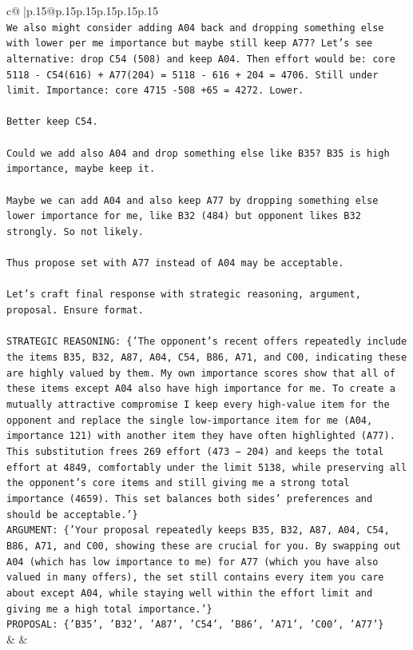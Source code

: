 \documentclass{article}
\begin{document}
{\begin{supertabular}{c@{$\;$}|p{.15\linewidth}@{}p{.15\linewidth}p{.15\linewidth}p{.15\linewidth}p{.15\linewidth}p{.15\linewidth}}
{{{\\ 
\texttt{We also might consider adding A04 back and dropping something else with lower per me importance but maybe still keep A77? Let's see alternative: drop C54 (508) and keep A04. Then effort would be: core 5118 {-} C54(616) + A77(204) = 5118 {-} 616 + 204 = 4706. Still under limit. Importance: core 4715 {-}508 +65 = 4272. Lower.} \\
\\ 
\texttt{Better keep C54.} \\
\\ 
\texttt{Could we add also A04 and drop something else like B35? B35 is high importance, maybe keep it.} \\
\\ 
\texttt{Maybe we can add A04 and also keep A77 by dropping something else lower importance for me, like B32 (484) but opponent likes B32 strongly. So not likely.} \\
\\ 
\texttt{Thus propose set with A77 instead of A04 may be acceptable.} \\
\\ 
\texttt{Let's craft final response with strategic reasoning, argument, proposal. Ensure format.} \\
\\ 
\texttt{STRATEGIC REASONING: \{'The opponent’s recent offers repeatedly include the items B35, B32, A87, A04, C54, B86, A71, and C00, indicating these are highly valued by them. My own importance scores show that all of these items except A04 also have high importance for me. To create a mutually attractive compromise I keep every high‑value item for the opponent and replace the single low‑importance item for me (A04, importance 121) with another item they have often highlighted (A77). This substitution frees 269 effort (473 − 204) and keeps the total effort at 4849, comfortably under the limit 5138, while preserving all the opponent’s core items and still giving me a strong total importance (4659). This set balances both sides’ preferences and should be acceptable.'\}} \\
\texttt{ARGUMENT: \{'Your proposal repeatedly keeps B35, B32, A87, A04, C54, B86, A71, and C00, showing these are crucial for you. By swapping out A04 (which has low importance to me) for A77 (which you have also valued in many offers), the set still contains every item you care about except A04, while staying well within the effort limit and giving me a high total importance.'\}} \\
\texttt{PROPOSAL: \{'B35', 'B32', 'A87', 'C54', 'B86', 'A71', 'C00', 'A77'\}} \\
            }
        }
    }
    & & \\ \\


\end{supertabular}}
\end{document}
